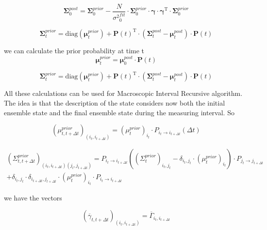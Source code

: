 \documentclass[pdflatex,sn-mathphys-num]{sn-jnl}%
\theoremstyle{thmstyleone}%
\theoremstyle{thmstyletwo}%
\theoremstyle{thmstylethree}%
\begin{document}
\begin{equation}
\mathbf \Sigma^{post}_0 = \mathbf \Sigma^{prior}_0 - {\frac {N}{{\sigma^2}^{fit}_0}}\cdot \mathbf \Sigma^{prior}_0 \cdot \mathbf \gamma \cdot {\mathbf \gamma}^\mathrm{T} \cdot \mathbf \Sigma^{prior}_0
\end{equation}

\begin{equation}
\mathbf \Sigma^{prior}_t= \mathrm{diag}(\mathbf \mu^{prior}_t ) + {\mathbf P(t)}^\mathrm{T} \cdot (\mathbf \Sigma^{post}_t- \mathbf \mu^{post}_t) \cdot \mathbf P( t)
\end{equation}

we can calculate the prior probability at time t
\begin{equation}
\mathbf \mu^{prior}_t = \mathbf \mu^{post}_0 \cdot \mathbf P(t)
\end{equation}

\begin{equation}
\mathbf \Sigma^{prior}_t= \mathrm{diag}(\mathbf \mu^{prior}_t ) + {\mathbf P(t)}^\mathrm{T} \cdot (\mathbf \Sigma^{post}_t- \mathbf \mu^{post}_t) \cdot \mathbf P( t)
\end{equation}



All these calculations can be used for Macroscopic Interval Recursive algorithm. The idea is that the description of the state considers now both the initial ensemble state and the final ensemble state during the measuring interval. 
So 

\begin{equation}
(\mu^{prior}_{t, t+ \Delta t})_{(i_t, i_{t+ \Delta t})} = (\mu^{prior}_{t})_{i_t}  \cdot P_{i_t \rightarrow i_{t+ \Delta t}}(\Delta t)
\end{equation}

\begin{multline}
(\Sigma^{prior}_{t,t+ \Delta t})_{(i_t, i_{t+ \Delta t})(j_t, j_{t+ \Delta t})} =
P_{i_t \rightarrow i_{t+ \Delta t}} \left((\Sigma^{prior}_{t})_{i_t ,j_t} - \delta_{i_t, j_t} \cdot (\mu^{prior}_t)_{i_t} \right)  \cdot P_{j_t \rightarrow j_{t+ \Delta t}} \\
+ \delta_{i_t, j_t} \cdot \delta_{i_{t+ \Delta t}, j_{t+ \Delta t}} \cdot (\mu^{prior}_t)_{i_t}\cdot P_{i_t \rightarrow i_{t+ \Delta t}} 
\end{multline}

we have the vectors 

\begin{equation}
({\overline \gamma}_{t,t+\Delta t })_{(i_t, i_{t+\Delta t})} = {\overline \Gamma}_{i_t,i_{t+\Delta t}}
\end{equation}
\end{document}
